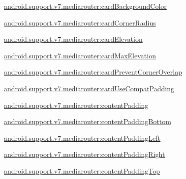 {\ttfamily \hyperlink{classandroid_1_1support_1_1v7_1_1mediarouter_1_1R_1_1styleable_ac8c7dbc2ce6622ee6fd96993e974ed28}{android.\+support.\+v7.\+mediarouter\+:card\+Background\+Color}}

{\ttfamily \hyperlink{classandroid_1_1support_1_1v7_1_1mediarouter_1_1R_1_1styleable_a548412d8d96cee090ee611a2476521d0}{android.\+support.\+v7.\+mediarouter\+:card\+Corner\+Radius}}

{\ttfamily \hyperlink{classandroid_1_1support_1_1v7_1_1mediarouter_1_1R_1_1styleable_ac95f8abaff3bbe9cdf203343d4259207}{android.\+support.\+v7.\+mediarouter\+:card\+Elevation}}

{\ttfamily \hyperlink{classandroid_1_1support_1_1v7_1_1mediarouter_1_1R_1_1styleable_ae32cba2f19b8ed4678602f08eb2cf8a9}{android.\+support.\+v7.\+mediarouter\+:card\+Max\+Elevation}}

{\ttfamily \hyperlink{classandroid_1_1support_1_1v7_1_1mediarouter_1_1R_1_1styleable_a454848c21083964d3e8349b51be1943e}{android.\+support.\+v7.\+mediarouter\+:card\+Prevent\+Corner\+Overlap}}

{\ttfamily \hyperlink{classandroid_1_1support_1_1v7_1_1mediarouter_1_1R_1_1styleable_a60a82a1904d0a54f4044b392f62eecfb}{android.\+support.\+v7.\+mediarouter\+:card\+Use\+Compat\+Padding}}

{\ttfamily \hyperlink{classandroid_1_1support_1_1v7_1_1mediarouter_1_1R_1_1styleable_af7ef5322522613934b0e313cc0c155b6}{android.\+support.\+v7.\+mediarouter\+:content\+Padding}}

{\ttfamily \hyperlink{classandroid_1_1support_1_1v7_1_1mediarouter_1_1R_1_1styleable_a777878e2a53c120829fa76dfd7786c17}{android.\+support.\+v7.\+mediarouter\+:content\+Padding\+Bottom}}

{\ttfamily \hyperlink{classandroid_1_1support_1_1v7_1_1mediarouter_1_1R_1_1styleable_aa88f6ec6b491928155b54b29bdd4a834}{android.\+support.\+v7.\+mediarouter\+:content\+Padding\+Left}}

{\ttfamily \hyperlink{classandroid_1_1support_1_1v7_1_1mediarouter_1_1R_1_1styleable_adda6aa23539f7df612d220bb2a3f95b6}{android.\+support.\+v7.\+mediarouter\+:content\+Padding\+Right}}

{\ttfamily \hyperlink{classandroid_1_1support_1_1v7_1_1mediarouter_1_1R_1_1styleable_a408aeb6a61417fdcead372dc44eb7d99}{android.\+support.\+v7.\+mediarouter\+:content\+Padding\+Top}}

